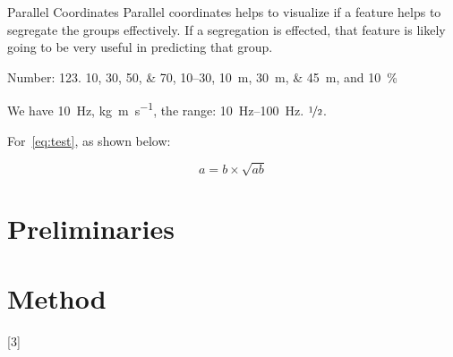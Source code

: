 Parallel Coordinates 
Parallel coordinates helps to visualize if a feature helps to segregate the groups effectively. If a segregation is effected, that feature is likely going to be very useful in predicting that group.


Number:
\num{123}.
\numlist{10;30;50;70},
\numrange{10}{30},
\SIlist{10;30;45}{\metre},
and
\SI{10}{\percent}



\begin{ConferenceOnly}
We have \SI{10}{\hertz},
\si{\kilogram\metre\per\second},
the range: \SIrange{10}{100}{\hertz}.
$\nicefrac[]{1}{2}$.


\end{ConferenceOnly}


For~\cref{eq:test},
as shown below:

\begin{equation}\label{eq:test}
a = b \times \sqrt{ab}
\end{equation}

\blindmathpaper

\section{Preliminaries} \label{sec-preliminaries}

\blindtext

\gliMarker  %


\section{Method} \label{sec-method}

\blindtext
{}[3]
\blinditemize
\blindenumerate

